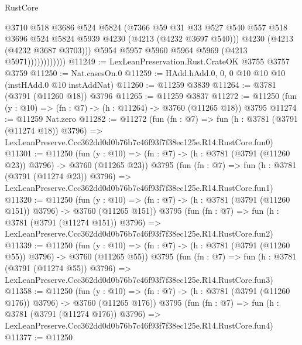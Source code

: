 \begin{lexlean}{RustCore}
\begin{coremodule}
                            @3710
                            @518
                            @3686
                            @524
                            @5824
                            (@7366
                              @59
                              @31
                              @33
                              @527
                              @540
                              @557
                              @518
                              @3696
                              @524
                              @5824
                              @5939
                              @4230
                              (@4213 (@4232 @3697 @540)))
                            @4230
                            (@4213 (@4232 @3687 @3703)))
                          @5954
                          @5957
                          @5960
                          @5964
                          @5969
                          (@4213 @5971))))))))))))
@11249 := LexLeanPreservation.Rust.CrateOK @3755 @3757 @3759
@11250 := Nat.casesOn.{0}
@11259 := HAdd.hAdd.{0, 0, 0} @10 @10 @10 (instHAdd.{0} @10 instAddNat)
@11260 := @11259 @3839
@11264 := @3781 (@3791 (@11260 @18)) @3796
@11265 := @11259 @3837
@11272 := @11250 (fun (y : @10) => (fn : @7) -> (h : @11264) -> @3760 (@11265 @18)) @3795
@11274 := @11259 Nat.zero
@11282 := @11272
    (fun (fn : @7) =>
    fun (h : @3781 (@3791 (@11274 @18)) @3796) =>
    LexLeanPreserve.Ccc362dd0d0b76b7c46f93f7f38ec125e.R14.RustCore.fun0)
@11301 := @11250
    (fun (y : @10) => (fn : @7) -> (h : @3781 (@3791 (@11260 @23)) @3796) -> @3760 (@11265 @23))
    @3795
    (fun (fn : @7) =>
    fun (h : @3781 (@3791 (@11274 @23)) @3796) =>
    LexLeanPreserve.Ccc362dd0d0b76b7c46f93f7f38ec125e.R14.RustCore.fun1)
@11320 := @11250
    (fun (y : @10) => (fn : @7) -> (h : @3781 (@3791 (@11260 @151)) @3796) -> @3760 (@11265 @151))
    @3795
    (fun (fn : @7) =>
    fun (h : @3781 (@3791 (@11274 @151)) @3796) =>
    LexLeanPreserve.Ccc362dd0d0b76b7c46f93f7f38ec125e.R14.RustCore.fun2)
@11339 := @11250
    (fun (y : @10) => (fn : @7) -> (h : @3781 (@3791 (@11260 @55)) @3796) -> @3760 (@11265 @55))
    @3795
    (fun (fn : @7) =>
    fun (h : @3781 (@3791 (@11274 @55)) @3796) =>
    LexLeanPreserve.Ccc362dd0d0b76b7c46f93f7f38ec125e.R14.RustCore.fun3)
@11358 := @11250
    (fun (y : @10) => (fn : @7) -> (h : @3781 (@3791 (@11260 @176)) @3796) -> @3760 (@11265 @176))
    @3795
    (fun (fn : @7) =>
    fun (h : @3781 (@3791 (@11274 @176)) @3796) =>
    LexLeanPreserve.Ccc362dd0d0b76b7c46f93f7f38ec125e.R14.RustCore.fun4)
@11377 := @11250

\end{coremodule}
\end{lexlean}
